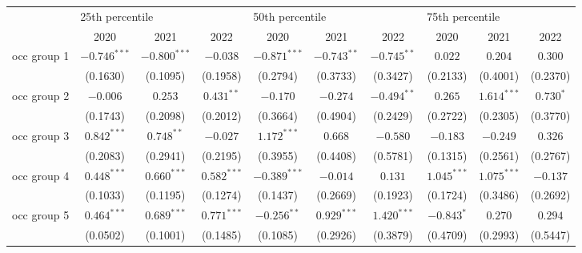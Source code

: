 \begin{tabular}{l|ccc|ccc|ccc|}
\toprule
{} & \multicolumn{3}{l}{25th percentile} & \multicolumn{3}{l}{50th percentile} & \multicolumn{3}{l}{75th percentile} \\
{} &            2020 &            2021 &            2022 &            2020 &            2021 &            2022 &            2020 &            2021 &            2022 \\
\midrule
occ group 1          &  $-0.746^{***}$ &  $-0.800^{***}$ &        $-0.038$ &  $-0.871^{***}$ &   $-0.743^{**}$ &   $-0.745^{**}$ &         $0.022$ &         $0.204$ &         $0.300$ \\
                     &        (0.1630) &        (0.1095) &        (0.1958) &        (0.2794) &        (0.3733) &        (0.3427) &        (0.2133) &        (0.4001) &        (0.2370) \\
occ group 2          &        $-0.006$ &         $0.253$ &    $0.431^{**}$ &        $-0.170$ &        $-0.274$ &   $-0.494^{**}$ &         $0.265$ &   $1.614^{***}$ &       $0.730^*$ \\
                     &        (0.1743) &        (0.2098) &        (0.2012) &        (0.3664) &        (0.4904) &        (0.2429) &        (0.2722) &        (0.2305) &        (0.3770) \\
occ group 3          &   $0.842^{***}$ &    $0.748^{**}$ &        $-0.027$ &   $1.172^{***}$ &         $0.668$ &        $-0.580$ &        $-0.183$ &        $-0.249$ &         $0.326$ \\
                     &        (0.2083) &        (0.2941) &        (0.2195) &        (0.3955) &        (0.4408) &        (0.5781) &        (0.1315) &        (0.2561) &        (0.2767) \\
occ group 4          &   $0.448^{***}$ &   $0.660^{***}$ &   $0.582^{***}$ &  $-0.389^{***}$ &        $-0.014$ &         $0.131$ &   $1.045^{***}$ &   $1.075^{***}$ &        $-0.137$ \\
                     &        (0.1033) &        (0.1195) &        (0.1274) &        (0.1437) &        (0.2669) &        (0.1923) &        (0.1724) &        (0.3486) &        (0.2692) \\
occ group 5          &   $0.464^{***}$ &   $0.689^{***}$ &   $0.771^{***}$ &   $-0.256^{**}$ &   $0.929^{***}$ &   $1.420^{***}$ &      $-0.843^*$ &         $0.270$ &         $0.294$ \\
                     &        (0.0502) &        (0.1001) &        (0.1485) &        (0.1085) &        (0.2926) &        (0.3879) &        (0.4709) &        (0.2993) &        (0.5447) \\

\end{tabular}
